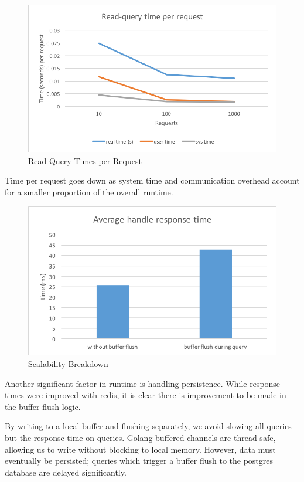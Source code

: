 \documentclass[titlepage, 11pt]{article}
\newcommand\0{\mathbf{0}}
\newcommand\<{\langle}
\renewcommand\>{\rangle}
\begin{document}
\begin{figure}[H]
\centering
\includegraphics[width=\linewidth]{read-query-times-per-request.png}
\caption{Read Query Times per Request}
\end{figure}

Time per request goes down as system time and communication overhead account for a smaller proportion of the overall runtime.

\begin{figure}[H]
\centering
\includegraphics[width=\linewidth]{handle_response_times.png}
\caption{Scalability Breakdown}
\end{figure}

Another significant factor in runtime is handling persistence. While response times were improved with redis, it is clear there is improvement to be made in the buffer flush logic.

By writing to a local buffer and flushing separately, we avoid slowing all queries but the response time on queries. Golang buffered channels are thread-safe, allowing us to write without blocking to local memory. However, data must eventually be persisted; queries which trigger a buffer flush to the postgres database are delayed significantly.
\end{document}

